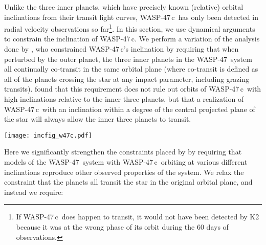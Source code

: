 \documentclass{emulateapj}
\newcommand{\thisstar}{WASP-47}
\newcommand{\thisfourthplanet}{WASP-47\,c}
\begin{document}
Unlike the three inner planets, which have precisely known (relative) orbital inclinations from their transit light curves, \thisfourthplanet\ has only been detected in radial velocity observations so far\footnote{If \thisfourthplanet\ does happen to transit, it would not have been detected by K2 because it was at the wrong phase of its orbit during the 60 days of observations.}. In this section, we use dynamical arguments to constrain the inclination of \thisfourthplanet. We perform a variation of the analysis done by \citet{beckeradams}, who constrained \thisfourthplanet's inclination by requiring that when perturbed by the outer planet, the three inner planets in the \thisstar\ system all continually co-transit in the same orbital plane (where co-transit is defined as all of the planets crossing the star at any impact parameter, including grazing transits). \citet{beckeradams} found that this requirement does not rule out orbits of \thisfourthplanet\ with high inclinations relative to the inner three planets, but that a realization of \thisfourthplanet\ with an inclination within a degree of the central projected plane of the star will always allow the inner three planets to transit. 

\begin{figure*}[ht!] %
   \centering
   \texttt{[image: incfig\_w47c.pdf]} %
   \caption{Constraints on the orbital inclination of \thisfourthplanet. This plot shows the fraction of time the \thisstar\ system can reproduce our observations as a function of the inclination of \thisfourthplanet. The dark purple line is the average fraction of the time our simulations reproduce our observations of \thisstar, and the colored contours show the 1$\sigma$ range calculated from the individual realizations. The inset diagram provides a zoomed-in version of the main figure to show the detail near $i_c$  = 90$^\circ$ (i.e., near the orbital plane of the inner planets).}
   \label{inclinationlimits}
\end{figure*}
Here we significantly strengthen the constraints placed by \citet{beckeradams} by requiring that models of the \thisstar\ system with \thisfourthplanet\ orbiting at various different inclinations reproduce other observed properties of the system. We relax the constraint that the planets all transit the star in the original orbital plane, and instead  we require: 
\end{document}
